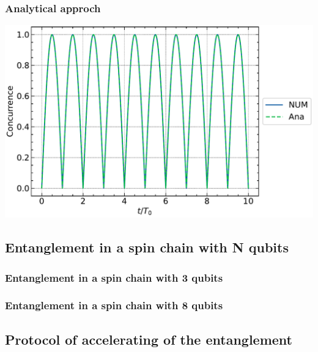 \subsubsection{Analytical approch}
\includegraphics*{results_and_discussion/2_qubits/up_down_with_ana.pdf}


\subsection{Entanglement in a spin chain with N qubits}

\subsubsection{Entanglement in a spin chain with 3 qubits}


\subsubsection{Entanglement in a spin chain with 8 qubits}


\subsection{Protocol of accelerating of the entanglement}